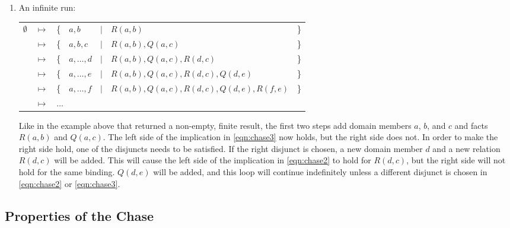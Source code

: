 \begin{enumerate}
		\item An infinite run:

			\begin{tabular}{lllllll}
				$\emptyset$ & $\mapsto$ & \{ & $a,b$        & $|$ & $R(a,b)$                                 & \} \\
				{}          & $\mapsto$ & \{ & $a,b,c$      & $|$ & $R(a,b), Q(a,c)$                         & \} \\
				{}          & $\mapsto$ & \{ & $a,\ldots,d$ & $|$ & $R(a,b), Q(a,c), R(d,c)$                 & \} \\
				{}          & $\mapsto$ & \{ & $a,\ldots,e$ & $|$ & $R(a,b), Q(a,c), R(d,c), Q(d,e)$         & \} \\
				{}          & $\mapsto$ & \{ & $a,\ldots,f$ & $|$ & $R(a,b), Q(a,c), R(d,c), Q(d,e), R(f,e)$ & \} \\
				{}          & $\mapsto$ & \multicolumn{5}{l}{ $\ldots$ }
			\end{tabular}

			Like in the example above that returned a non-empty, finite result,
			the first two steps add domain members $a$, $b$, and $c$ and facts
			$R(a,b)$ and $Q(a,c)$. The left side of the implication in
			\eqref{eqn:chase3} now holds, but the right side does not. In order
			to make the right side hold, one of the disjuncts needs to be
			satisfied. If the right disjunct is chosen, a new domain member $d$
			and a new relation $R(d,c)$ will be added. This will cause the left
			side of the implication in \eqref{eqn:chase2} to hold for $R(d,c)$,
			but the right side will not hold for the same binding. $Q(d,e)$
			will be added, and this loop will continue indefinitely unless a
			different disjunct is chosen in \eqref{eqn:chase2} or
			\eqref{eqn:chase3}.

		\end{enumerate}

	\subsection{Properties of the Chase}



